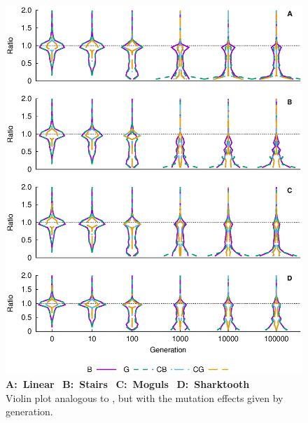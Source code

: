 \documentclass[a4paper,12pt]{article}
\theoremstyle{plain}
\theoremstyle{definition}
\begin{document}
   \begin{figure}[H]
      \vspace{-.5cm}
      \hspace{-0cm}
      \includegraphics[trim=0 4.7cm 0
      0,width=1\textwidth]{multihisto_generation} %
      \captionsetup{width=1.\textwidth}
      \caption{
         \textbf{A:~Linear} \ \textbf{B:~Stairs} \ \textbf{C:~Moguls} \
         \textbf{D:~Sharktooth} \\
      \indent Violin plot analogous to , but with
      the mutation effects given by generation. }
      \label{fig:distribution_generation}
   \end{figure}

\end{document}
